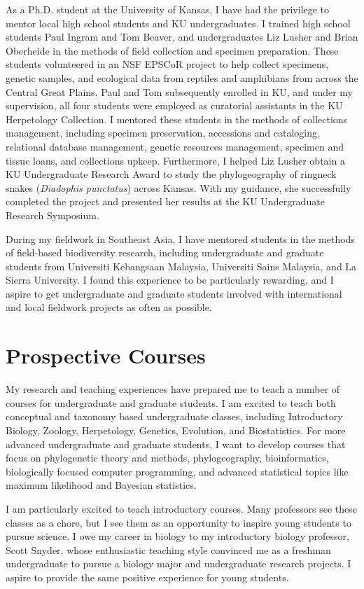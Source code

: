 \documentclass[10pt]{article}
\begin{document}
As a Ph.D. student at the University of Kansas, I have had the privilege to
mentor local high school students and KU undergraduates.
I trained high school students Paul Ingram and Tom Beaver, and undergraduates
Liz Lusher and Brian Oberheide in the methods of field collection and specimen
preparation.
These students volunteered in an NSF EPSCoR project to help collect specimens,
genetic samples, and ecological data from reptiles and amphibians from across
the Central Great Plains.
Paul and Tom subsequently enrolled in KU, and under my supervision, all four
students were employed as curatorial assistants in the KU Herpetology
Collection.
I mentored these students in the methods of collections management, including
specimen preservation, accessions and cataloging, relational database
management, genetic resources management, specimen and tissue loans, and
collections upkeep.
Furthermore, I helped Liz Lusher obtain a KU Undergraduate Research Award to
study the phylogeography of ringneck snakes (\emph{Diadophis punctatus}) across
Kansas.
With my guidance, she successfully completed the project and presented her
results at the KU Undergraduate Research Symposium.

During my fieldwork in Southeast Asia, I have mentored students in the methods
of field-based biodiversity research, including undergraduate and graduate
students from Universiti Kebangsaan Malaysia, Universiti Sains Malaysia, and La
Sierra University.
I found this experience to be particularly rewarding, and I aspire to get
undergraduate and graduate students involved with international and local
fieldwork projects as often as possible.

\section*{Prospective Courses}
My research and teaching experiences have prepared me to teach a number of
courses for undergraduate and graduate students.
I am excited to teach both conceptual and taxonomy based undergraduate classes,
including Introductory Biology, Zoology, Herpetology, Genetics, Evolution, and
Biostatistics.
For more advanced undergraduate and graduate students, I want to develop
courses that focus on phylogenetic theory and methods, phylogeography,
bioinformatics, biologically focused computer programming, and advanced
statistical topics like maximum likelihood and Bayesian statistics.

I am particularly excited to teach introductory courses.
Many professors see these classes as a chore, but I see them as an opportunity
to inspire young students to pursue science.
I owe my career in biology to my introductory biology professor, Scott Snyder,
whose enthusiastic teaching style convinced me as a freshman undergraduate to
pursue a biology major and undergraduate research projects.
I aspire to provide the same positive experience for young students.
\end{document}
